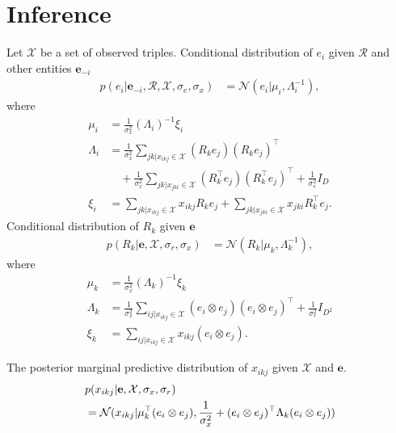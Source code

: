 \documentclass{article}
\begin{document}
\section{Inference}

Let $\mathcal{X}$ be a set of observed triples. Conditional distribution of $e_i$ given $\mathcal{R}$ and other entities $\mathbf{e}_{-i}$
\begin{align} \label{eqn:sample_e}
p(e_i |\mathbf{e}_{-i}, \mathcal{R}, \mathcal{X}, \sigma_e, \sigma_x) &= \mathcal{N}(e_i | \mu_i, \Lambda_i^{-1}),
\end{align}
where
\begin{align*}
\mu_i &= \frac{1}{\sigma_x^2}(\Lambda_i)^{-1}\xi_i \\
\Lambda_i &= \frac{1}{\sigma_x^2} \sum_{jk | x_{ikj} \in \mathcal{X}}(R_k e_j)(R_k e_j)^\top \\
&\quad+ \frac{1}{\sigma_x^2} \sum_{jk | x_{jki} \in \mathcal{X}} (R_k^\top e_j)(R_k^\top e_j)^\top+ \frac{1}{\sigma_e^2} {I}_D \\
\xi_i &= \sum_{jk | x_{ikj} \in \mathcal{X}} x_{ikj} R_{k} e_{j} + \sum_{jk | x_{jki} \in \mathcal{X}} x_{jki} R_{k}^\top e_{j}.
\end{align*}
Conditional distribution of $R_k$ given $\mathbf{e}$
\begin{align}
\label{eqn:sample_r}
p(R_k|\mathbf{e}, \mathcal{X}, \sigma_r, \sigma_x)  &= \mathcal{N}(R_k | \mu_k, \Lambda_k^{-1}),
\end{align}
where
\begin{align*}
\mu_k &= \frac{1}{\sigma_x^2}(\Lambda_k)^{-1}\xi_k \\
\Lambda_k &= \frac{1}{\sigma_x^2} \sum_{ij| x_{ikj} \in \mathcal{X}} (e_i \otimes e_j)(e_i \otimes e_j)^\top + \frac{1}{\sigma_r^2} {I}_{D^2} \\
\xi_k &= \sum_{ij| x_{ikj} \in \mathcal{X}} x_{ikj} (e_{i} \otimes e_{j}).
\end{align*}

The posterior marginal predictive distribution of $x_{ikj}$ given $\mathcal{X}$ and $\mathbf{e}$.
\begin{align}
\label{eqn:marginal_predict}
&p(x_{ikj}| \mathbf{e}, \mathcal{X}, \sigma_x, \sigma_r) \\
&= \mathcal{N}(x_{ikj}| \mu_k ^\top (e_i \otimes e_j), \frac{1}{\sigma_x^2} +  (e_i \otimes e_j)^\top \Lambda_k (e_i \otimes e_j)) \notag
\end{align}
\end{document}
